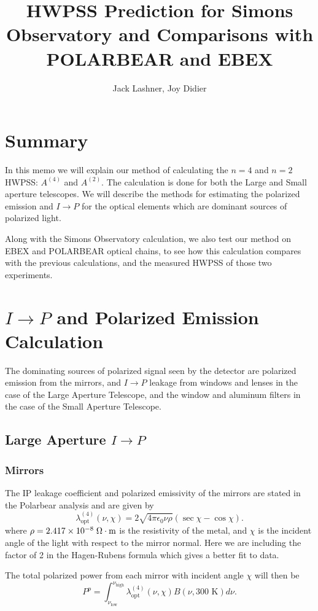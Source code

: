 \documentclass{article}
\title{HWPSS Prediction for Simons Observatory and Comparisons with POLARBEAR and EBEX}
\author{Jack Lashner, Joy Didier}
\theoremstyle{remark}
\newcommand{\tab}{\hspace*{2em}}
\renewcommand{\t}[1]{\text{#1}}
\newcommand{\A}[1]{A^{(#1)}}
\newcommand{\lo}{\lambda_\t{opt}^{(4)}}
\newcommand{\ip}{$I\rightarrow P$ }
\begin{document}
\maketitle
\section*{Summary}
\tab In this memo we will explain our method of calculating the $n=4$ and $n=2$ HWPSS: $\A4$ and $\A2$. 
The calculation is done for both the Large and Small aperture telescopes. 
We will describe the methods for estimating the polarized emission and \ip for the optical elements which are dominant sources of polarized light.

Along with the Simons Observatory calculation, we also test our method on EBEX and POLARBEAR optical chains,
to see how this calculation compares with the previous calculations, and the measured HWPSS of those two experiments.

\section{\ip and Polarized Emission Calculation}

The dominating sources of polarized signal seen by the detector are polarized emission from the mirrors, and $I\rightarrow P$ leakage from windows and lenses in the case of the Large Aperture Telescope,
and the window and aluminum filters in the case of the Small Aperture Telescope.

\subsection{Large Aperture \ip}

\subsubsection{Mirrors}
\tab The IP leakage coefficient and polarized emissivity of the mirrors are stated in the Polarbear analysis \cite{takakura_performance_2017} and are given by
\[\lo(\nu, \chi) = 2 \sqrt{4 \pi \epsilon_0 \nu \rho} (\sec\chi - \cos\chi).\]
where $\rho = 2.417\times 10^{-8} \; \ohm \cdot \t{m}$ is the resistivity of the metal, and $\chi$ is the incident angle of the light with respect to the mirror normal.
Here we are including the factor of 2 in the Hagen-Rubens formula which gives a better fit to data.

\tab The total polarized power from each mirror with incident angle $\chi$ will then be
\[
P^{p} = \int_{\nu_\t{low}}^{\nu_\t{high}} \lo(\nu, \chi) B(\nu, 300 \t{ K}) d\nu.
\]
\end{document}
